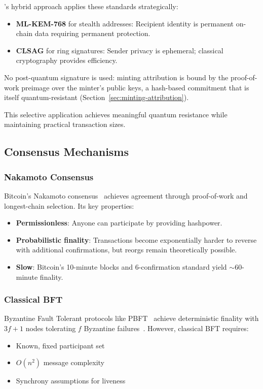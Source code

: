\Botho's hybrid approach applies these standards strategically:
\begin{itemize}
  \item \textbf{ML-KEM-768} for stealth addresses: Recipient identity is
    permanent on-chain data requiring permanent protection.
  \item \textbf{CLSAG} for ring signatures: Sender privacy is ephemeral;
    classical cryptography provides efficiency.
\end{itemize}

No post-quantum signature is used: minting attribution is bound by the
proof-of-work preimage over the minter's public keys, a hash-based
commitment that is itself quantum-resistant
(Section~\ref{sec:minting-attribution}).

This selective application achieves meaningful quantum resistance while
maintaining practical transaction sizes.

\subsection{Consensus Mechanisms}

\subsubsection{Nakamoto Consensus}

Bitcoin's Nakamoto consensus~\cite{nakamoto2008bitcoin} achieves agreement
through proof-of-work and longest-chain selection. Its key properties:
\begin{itemize}
  \item \textbf{Permissionless}: Anyone can participate by providing
    hashpower.
  \item \textbf{Probabilistic finality}: Transactions become exponentially
    harder to reverse with additional confirmations, but reorgs remain
    theoretically possible.
  \item \textbf{Slow}: Bitcoin's 10-minute blocks and 6-confirmation
    standard yield $\sim$60-minute finality.
\end{itemize}

\subsubsection{Classical BFT}

Byzantine Fault Tolerant protocols like PBFT~\cite{pbft} achieve
deterministic finality with $3f+1$ nodes tolerating $f$ Byzantine failures~\cite{byzantine}.
However, classical BFT requires:
\begin{itemize}
  \item Known, fixed participant set
  \item $O(n^2)$ message complexity
  \item Synchrony assumptions for liveness
\end{itemize}

